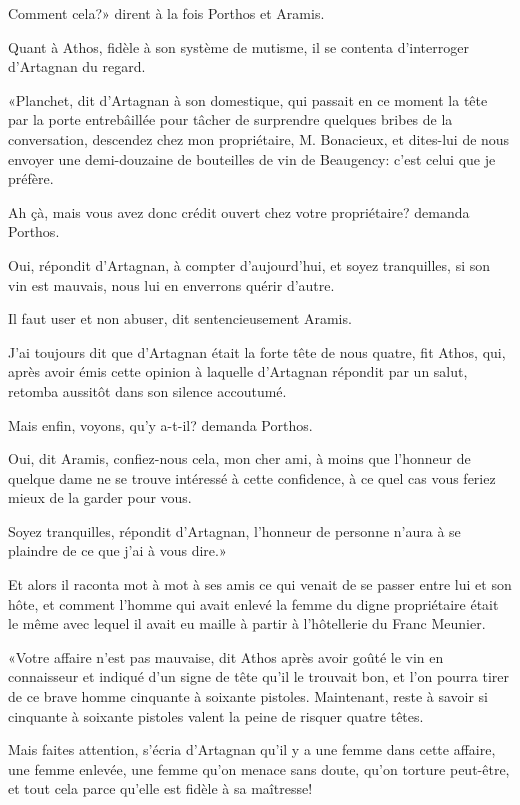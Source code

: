 \speak  Comment cela?» dirent à la fois Porthos et Aramis. 

Quant à Athos, fidèle à son système de mutisme, il se contenta d'interroger d'Artagnan du regard. 

«Planchet, dit d'Artagnan à son domestique, qui passait en ce moment la tête par la porte entrebâillée pour tâcher de surprendre quelques bribes de la conversation, descendez chez mon propriétaire, M. Bonacieux, et dites-lui de nous envoyer une demi-douzaine de bouteilles de vin de Beaugency: c'est celui que je préfère. 

\speak  Ah çà, mais vous avez donc crédit ouvert chez votre propriétaire? demanda Porthos. 

\speak  Oui, répondit d'Artagnan, à compter d'aujourd'hui, et soyez tranquilles, si son vin est mauvais, nous lui en enverrons quérir d'autre. 

\speak  Il faut user et non abuser, dit sentencieusement Aramis. 

\speak  J'ai toujours dit que d'Artagnan était la forte tête de nous quatre, fit Athos, qui, après avoir émis cette opinion à laquelle d'Artagnan répondit par un salut, retomba aussitôt dans son silence accoutumé. 

\speak  Mais enfin, voyons, qu'y a-t-il? demanda Porthos. 

\speak  Oui, dit Aramis, confiez-nous cela, mon cher ami, à moins que l'honneur de quelque dame ne se trouve intéressé à cette confidence, à ce quel cas vous feriez mieux de la garder pour vous. 

\speak  Soyez tranquilles, répondit d'Artagnan, l'honneur de personne n'aura à se plaindre de ce que j'ai à vous dire.» 

Et alors il raconta mot à mot à ses amis ce qui venait de se passer entre lui et son hôte, et comment l'homme qui avait enlevé la femme du digne propriétaire était le même avec lequel il avait eu maille à partir à l'hôtellerie du Franc Meunier. 

«Votre affaire n'est pas mauvaise, dit Athos après avoir goûté le vin en connaisseur et indiqué d'un signe de tête qu'il le trouvait bon, et l'on pourra tirer de ce brave homme cinquante à soixante pistoles. Maintenant, reste à savoir si cinquante à soixante pistoles valent la peine de risquer quatre têtes. 

\speak  Mais faites attention, s'écria d'Artagnan qu'il y a une femme dans cette affaire, une femme enlevée, une femme qu'on menace sans doute, qu'on torture peut-être, et tout cela parce qu'elle est fidèle à sa maîtresse! 

